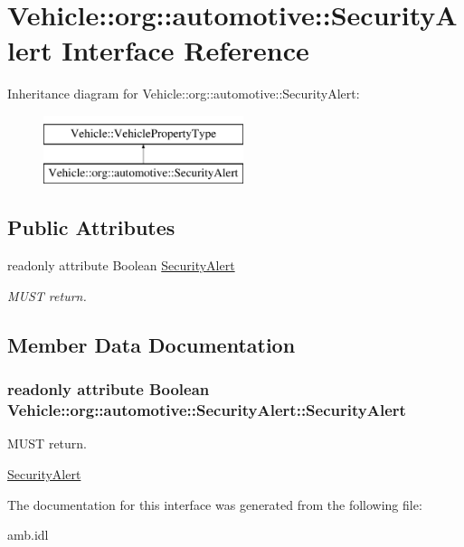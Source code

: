 \hypertarget{interfaceVehicle_1_1org_1_1automotive_1_1SecurityAlert}{\section{Vehicle\-:\-:org\-:\-:automotive\-:\-:Security\-Alert Interface Reference}
\label{interfaceVehicle_1_1org_1_1automotive_1_1SecurityAlert}
}
Inheritance diagram for Vehicle\-:\-:org\-:\-:automotive\-:\-:Security\-Alert\-:\begin{figure}[H]
\begin{center}
\leavevmode
\includegraphics[height=2.000000cm]{interfaceVehicle_1_1org_1_1automotive_1_1SecurityAlert}
\end{center}
\end{figure}
\subsection*{Public Attributes}
\begin{DoxyCompactItemize}
\item 
readonly attribute Boolean \hyperlink{interfaceVehicle_1_1org_1_1automotive_1_1SecurityAlert_acfa80c9f65fe0406b66ba90d36e9d1b2}{Security\-Alert}
\begin{DoxyCompactList}\small\item\em M\-U\-S\-T return. \end{DoxyCompactList}\end{DoxyCompactItemize}


\subsection{Member Data Documentation}
\hypertarget{interfaceVehicle_1_1org_1_1automotive_1_1SecurityAlert_acfa80c9f65fe0406b66ba90d36e9d1b2}{
\subsubsection[{Security\-Alert}]{\setlength{\rightskip}{0pt plus 5cm}readonly attribute Boolean Vehicle\-::org\-::automotive\-::\-Security\-Alert\-::\-Security\-Alert}}\label{interfaceVehicle_1_1org_1_1automotive_1_1SecurityAlert_acfa80c9f65fe0406b66ba90d36e9d1b2}


M\-U\-S\-T return. 

\hyperlink{interfaceVehicle_1_1org_1_1automotive_1_1SecurityAlert}{Security\-Alert} 

The documentation for this interface was generated from the following file\-:\begin{DoxyCompactItemize}
\item 
amb.\-idl\end{DoxyCompactItemize}
